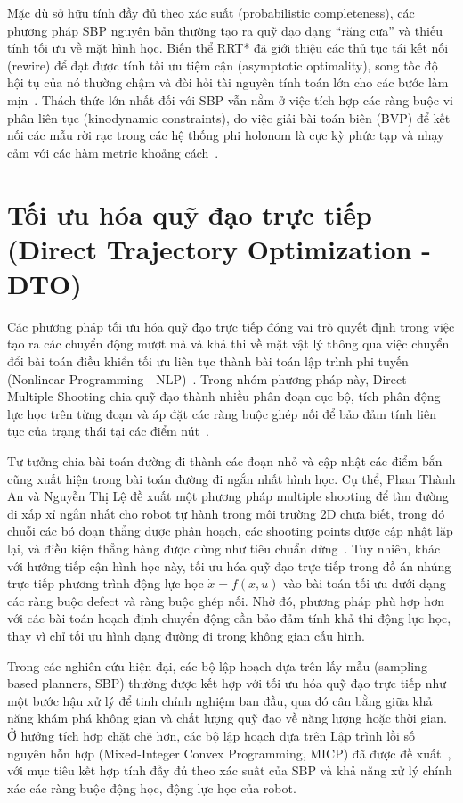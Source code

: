 Mặc dù sở hữu tính đầy đủ theo xác suất (probabilistic completeness), các phương pháp SBP nguyên bản thường tạo ra quỹ đạo dạng ``răng cưa'' và thiếu tính tối ưu về mặt hình học. Biến thể RRT* đã giới thiệu các thủ tục tái kết nối (rewire) để đạt được tính tối ưu tiệm cận (asymptotic optimality), song tốc độ hội tụ của nó thường chậm và đòi hỏi tài nguyên tính toán lớn cho các bước làm mịn~\cite{GammellEtAl2014}. Thách thức lớn nhất đối với SBP vẫn nằm ở việc tích hợp các ràng buộc vi phân liên tục (kinodynamic constraints), do việc giải bài toán biên (BVP) để kết nối các mẫu rời rạc trong các hệ thống phi holonom là cực kỳ phức tạp và nhạy cảm với các hàm metric khoảng cách~\cite{GammellEtAl2014}.

\section{Tối ưu hóa quỹ đạo trực tiếp (Direct Trajectory Optimization - DTO)}

Các phương pháp tối ưu hóa quỹ đạo trực tiếp đóng vai trò quyết định trong việc tạo ra các chuyển động mượt mà và khả thi về mặt vật lý thông qua việc chuyển đổi bài toán điều khiển tối ưu liên tục thành bài toán lập trình phi tuyến (Nonlinear Programming - NLP)~\cite{Betts2010}. Trong nhóm phương pháp này, Direct Multiple Shooting chia quỹ đạo thành nhiều phân đoạn cục bộ, tích phân động lực học trên từng đoạn và áp đặt các ràng buộc ghép nối để bảo đảm tính liên tục của trạng thái tại các điểm nút~\cite{BockPlitt1984}. 

Tư tưởng chia bài toán đường đi thành các đoạn nhỏ và cập nhật các điểm bắn cũng xuất hiện trong bài toán đường đi ngắn nhất hình học. Cụ thể, Phan Thành An và Nguyễn Thị Lệ đề xuất một phương pháp multiple shooting để tìm đường đi xấp xỉ ngắn nhất cho robot tự hành trong môi trường 2D chưa biết, trong đó chuỗi các bó đoạn thẳng được phân hoạch, các shooting points được cập nhật lặp lại, và điều kiện thẳng hàng được dùng như tiêu chuẩn dừng~\cite{AnLe2023MMS}. Tuy nhiên, khác với hướng tiếp cận hình học này, tối ưu hóa quỹ đạo trực tiếp trong đồ án nhúng trực tiếp phương trình động lực học $\dot{x}=f(x,u)$ vào bài toán tối ưu dưới dạng các ràng buộc defect và ràng buộc ghép nối. Nhờ đó, phương pháp phù hợp hơn với các bài toán hoạch định chuyển động cần bảo đảm tính khả thi động lực học, thay vì chỉ tối ưu hình dạng đường đi trong không gian cấu hình.

Trong các nghiên cứu hiện đại, các bộ lập hoạch dựa trên lấy mẫu (sampling-based planners, SBP) thường được kết hợp với tối ưu hóa quỹ đạo trực tiếp như một bước hậu xử lý để tinh chỉnh nghiệm ban đầu, qua đó cân bằng giữa khả năng khám phá không gian và chất lượng quỹ đạo về năng lượng hoặc thời gian. Ở hướng tích hợp chặt chẽ hơn, các bộ lập hoạch dựa trên Lập trình lồi số nguyên hỗn hợp (Mixed-Integer Convex Programming, MICP) đã được đề xuất~\cite{MarcucciEtAl2023GCS}, với mục tiêu kết hợp tính đầy đủ theo xác suất của SBP và khả năng xử lý chính xác các ràng buộc động học, động lực học của robot.

